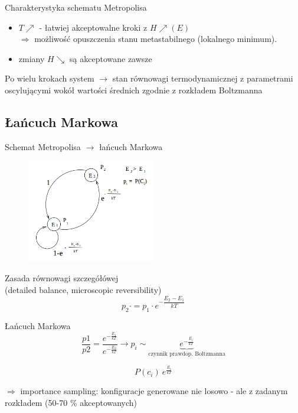 	
	\begin{frame}{Charakterystyka schematu Metropolisa}
		\begin{itemize}
			\item $T \nearrow$ - łatwiej akceptowalne kroki z $H \nearrow (E)$ \\ $ \Rightarrow$ możliwość opuszczenia stanu metastabilnego (lokalnego minimum).
			\item zmiany $H \searrow$ są akceptowane zawsze
		\end{itemize}
		
		Po wielu krokach system $\rightarrow$ stan równowagi termodynamicznej z parametrami oscylującymi wokół wartości średnich zgodnie z rozkładem Boltzmanna
	\end{frame}

\subsection{Łańcuch Markowa}
	
	\begin{frame}{Schemat Metropolisa $\rightarrow$ łańcuch Markowa}
		\begin{figure}
				\includegraphics[width=0.5\textwidth]{img/18/markow}
		\end{figure}
		\begin{block}{Zasada równowagi szczegółówej\\ 
		(detailed balance, microscopic reversibility)}
			$$
			p_2 \cdot = p_1 \cdot e^{- \dfrac{E_2 - E_1}{kT}}
			$$
		\end{block}
	\end{frame}

	\begin{frame}{Łańcuch Markowa}
		$$
		\frac{p1}{p2} = \dfrac{e^{-\frac{E_1}{kT}}}{e^{-\frac{E_2}{kT}}} \rightarrow p_i \sim \underbrace{e^{-\frac{E_i}{kT}}}_{\text{czynnik prawdop. Boltzmanna}}
		$$		
		
		$$
		P(c_i) ~ e^{\frac{E_i}{kT}}
		$$
		
		$\Rightarrow$ importance sampling: konfiguracje generowane nie losowo - ale z zadanym rozkładem (50-70 \% akceptowanych)
		
		
	\end{frame}
	
